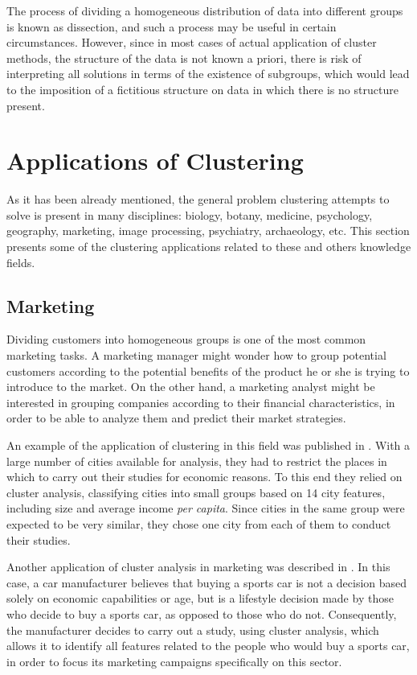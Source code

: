 The process of dividing a homogeneous distribution of data into different groups is known as dissection, and such a process may be useful in certain circumstances. However, since in most cases of actual application of cluster methods, the structure of the data is not known a priori, there is risk of interpreting all solutions in terms of the existence of subgroups, which would lead to the imposition of a fictitious structure on data in which there is no structure present.

\section{Applications of Clustering}

As it has been already mentioned, the general problem clustering attempts to solve is present in many disciplines: biology, botany, medicine, psychology, geography, marketing, image processing, psychiatry, archaeology, etc. This section presents some of the clustering applications related to these and others knowledge fields.

\subsection{Marketing}

Dividing customers into homogeneous groups is one of the most common marketing tasks. A marketing manager might wonder how to group potential customers according to the potential benefits of the product he or she is trying to introduce to the market. On the other hand, a marketing analyst might be interested in grouping companies according to their financial characteristics, in order to be able to analyze them and predict their market strategies.

An example of the application of clustering in this field was published in \cite{green1967cluster}. With a large number of cities available for analysis, they had to restrict the places in which to carry out their studies for economic reasons. To this end they relied on cluster analysis, classifying cities into small groups based on 14 city features, including size and average income \textit{per capita}. Since cities in the same group were expected to be very similar, they chose one city from each of them to conduct their studies.

Another application of cluster analysis in marketing was described in \cite{chakrapani2004statistics}. In this case, a car manufacturer believes that buying a sports car is not a decision based solely on economic capabilities or age, but is a lifestyle decision made by those who decide to buy a sports car, as opposed to those who do not. Consequently, the manufacturer decides to carry out a study, using cluster analysis, which allows it to identify all features related to the people who would buy a sports car, in order to focus its marketing campaigns specifically on this sector.

